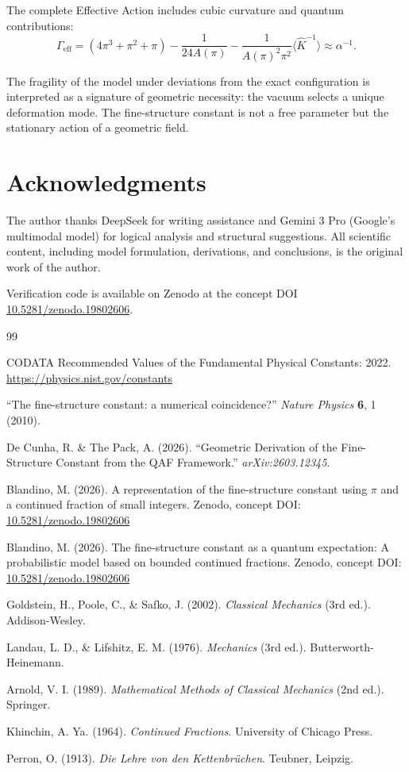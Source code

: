 \documentclass[12pt]{article}
\begin{document}
The complete Effective Action includes cubic curvature and quantum contributions:
\[
\Gamma_{\text{eff}} = (4\pi^3 + \pi^2 + \pi) - \frac{1}{24A(\pi)} - \frac{1}{A(\pi)^2 \pi^2} \langle \hat K^{-1} \rangle \approx \alpha^{-1}.
\]

The fragility of the model under deviations from the exact configuration is interpreted as a signature of geometric necessity: the vacuum selects a unique deformation mode. The fine-structure constant is not a free parameter but the stationary action of a geometric field.

\section*{Acknowledgments}

The author thanks DeepSeek for writing assistance and Gemini 3 Pro (Google's multimodal model) for logical analysis and structural suggestions. All scientific content, including model formulation, derivations, and conclusions, is the original work of the author.

Verification code is available on Zenodo at the concept DOI \href{https://doi.org/10.5281/zenodo.19802606}{10.5281/zenodo.19802606}.

\begin{thebibliography}{99}

CODATA Recommended Values of the Fundamental Physical Constants: 2022. 
\url{https://physics.nist.gov/constants}

``The fine-structure constant: a numerical coincidence?'' \textit{Nature Physics} \textbf{6}, 1 (2010).

De Cunha, R. \& The Pack, A. (2026). ``Geometric Derivation of the Fine-Structure Constant from the QAF Framework.'' \textit{arXiv:2603.12345}.

Blandino, M. (2026). A representation of the fine-structure constant using $\pi$ and a continued fraction of small integers.
Zenodo, concept DOI: \href{https://doi.org/10.5281/zenodo.19802606}{10.5281/zenodo.19802606}

Blandino, M. (2026). The fine-structure constant as a quantum expectation: A probabilistic model based on bounded continued fractions.
Zenodo, concept DOI: \href{https://doi.org/10.5281/zenodo.19802606}{10.5281/zenodo.19802606}

Goldstein, H., Poole, C., \& Safko, J. (2002). \textit{Classical Mechanics} (3rd ed.). Addison-Wesley.

Landau, L. D., \& Lifshitz, E. M. (1976). \textit{Mechanics} (3rd ed.). Butterworth-Heinemann.

Arnold, V. I. (1989). \textit{Mathematical Methods of Classical Mechanics} (2nd ed.). Springer.

Khinchin, A. Ya. (1964). \textit{Continued Fractions}. University of Chicago Press.

Perron, O. (1913). \textit{Die Lehre von den Kettenbrüchen}. Teubner, Leipzig.

\end{thebibliography}
\end{document}
